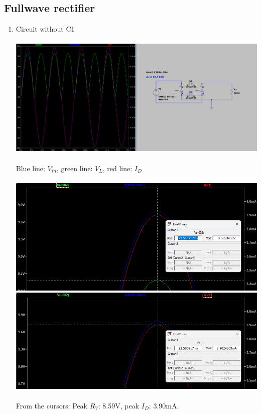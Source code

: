 \documentclass{article}
\begin{document}
		\subsection{Fullwave rectifier}
			\begin{enumerate}
				\item Circuit without C1\\\\
				\includegraphics[scale=0.35]{prelab/problem 3 - 1}\\\\
				Blue line: \(V_{in}\), green line: \(V_L\), red line: \(I_D\)\\\\
				\includegraphics[scale=0.35]{prelab/problem 3 - 2}
				\includegraphics[scale=0.35]{prelab/problem 3 - 3}\\\\
				From the cursors: Peak \(R_V\): 8.59V, peak \(I_D\): 3.90mA.\\

\end{enumerate}
\end{document}
